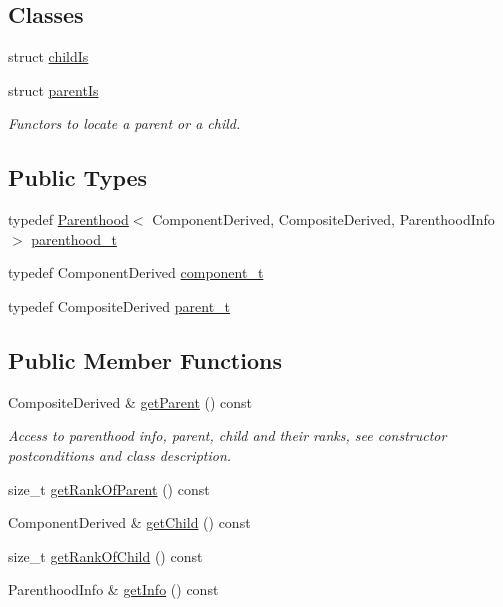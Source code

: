 \subsection*{Classes}
\begin{DoxyCompactItemize}
\item 
struct \hyperlink{structocra_1_1Parenthood_1_1childIs}{child\+Is}
\item 
struct \hyperlink{structocra_1_1Parenthood_1_1parentIs}{parent\+Is}
\begin{DoxyCompactList}\small\item\em Functors to locate a parent or a child. \end{DoxyCompactList}\end{DoxyCompactItemize}
\subsection*{Public Types}
\begin{DoxyCompactItemize}
\item 
typedef \hyperlink{classocra_1_1Parenthood}{Parenthood}$<$ Component\+Derived, Composite\+Derived, Parenthood\+Info $>$ \hyperlink{classocra_1_1Parenthood_acdae20cb747190b5dc9dbe42290bde78}{parenthood\+\_\+t}
\item 
typedef Component\+Derived \hyperlink{classocra_1_1Parenthood_a44b601577125fe0fd1d1e5ae4f143349}{component\+\_\+t}
\item 
typedef Composite\+Derived \hyperlink{classocra_1_1Parenthood_a2f95265c57cf96bbc26afee2ac757dd6}{parent\+\_\+t}
\end{DoxyCompactItemize}
\subsection*{Public Member Functions}
{\bf }\par
\begin{DoxyCompactItemize}
\item 
Composite\+Derived \& \hyperlink{classocra_1_1Parenthood_ac7e617fc08d7bed72fc6f90579b5cef7}{get\+Parent} () const
\begin{DoxyCompactList}\small\item\em Access to parenthood info, parent, child and their ranks, see constructor postconditions and class description. \end{DoxyCompactList}\item 
size\+\_\+t \hyperlink{classocra_1_1Parenthood_a82bb7a676d20350435a07b710de57052}{get\+Rank\+Of\+Parent} () const
\item 
Component\+Derived \& \hyperlink{classocra_1_1Parenthood_a7056661e3f0e6500141d305e6397f7c0}{get\+Child} () const
\item 
size\+\_\+t \hyperlink{classocra_1_1Parenthood_a51674187858154add6b9ca7d14110613}{get\+Rank\+Of\+Child} () const
\item 
Parenthood\+Info \& \hyperlink{classocra_1_1Parenthood_a3f3dc26c36363b7b968a7d0a26bc71a5}{get\+Info} () const
\end{DoxyCompactItemize}

